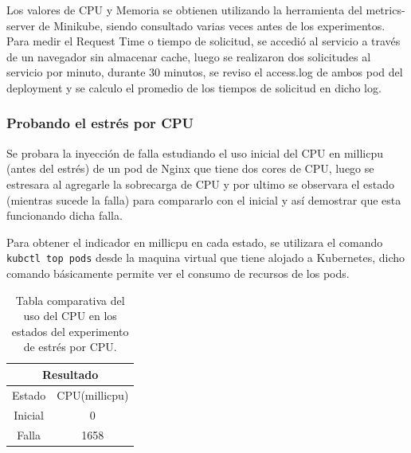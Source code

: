 \par Los valores de CPU y Memoria se obtienen utilizando la herramienta del metrics-server de Minikube, siendo consultado varias veces antes de los experimentos. Para medir el Request Time o tiempo de solicitud, se accedió al servicio a través de un navegador sin almacenar cache, luego se realizaron dos solicitudes al servicio por minuto, durante 30 minutos, se reviso el access.log de ambos pod del deployment y se calculo el promedio de los tiempos de solicitud en dicho log.

\subsubsection{Probando el estrés por CPU}


\par Se probara la inyección de falla estudiando el uso inicial del CPU en millicpu (antes del estrés) de un pod de Nginx que tiene dos cores de CPU, luego se estresara al agregarle la sobrecarga de CPU y por ultimo se observara el estado (mientras sucede la falla) para compararlo con el inicial y así demostrar que esta funcionando dicha falla.\\

\par Para obtener el indicador en millicpu en cada estado, se utilizara el comando \\ \verb|kubctl top pods| desde la maquina virtual que tiene alojado a Kubernetes, dicho comando básicamente permite ver el consumo de recursos de los pods.\\

\begin{table}[ht!]
\begin{center}
\begin{tabular}{ |c|c| } 
 \hline
 \multicolumn{2}{|c|}{Resultado} \\
 \hline
 \hline
 Estado & CPU(millicpu)\\
 \hline
 Inicial & 0\\
 Falla & 1658\\
 \hline
\end{tabular}
\end{center}
\caption{Tabla comparativa del uso del CPU en los estados del experimento de estrés por CPU.}
\label{tab:tabla41}
\end{table}


